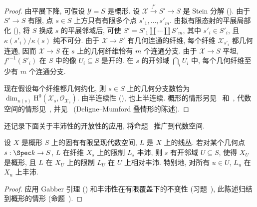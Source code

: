 \begin{proof}
由平展下降, 可假设 $\mathcal Y=S$ 是概形. 设 $\mathcal X\xrightarrow{f'}S'\to S$ 是 Stein 分解 (). 由于 $S'\to S$ 有限, 点 $s\in S$ 上方只有有限多个点 $s'_1,\ldots,s'_m$. 由拟有限态射的平展局部化 (), 将 $S$ 换成 $s$ 的平展邻域后, 可使 $S'=S'_1\amalg\cdots\amalg S'_m$, 其中 $s'_i\in S'_i$, 且 $\kappa(s'_i)/\kappa(s)$ 纯不可分. 由于 $\mathcal X\to S'$ 有几何连通的纤维, 每个纤维 $\mathcal X_{s'_i}$ 都几何连通, 因而 $\mathcal X\to S$ 在 $s$ 上的几何纤维恰有 $m$ 个连通分支. 由于 $\mathcal X\to S$ 平坦, $f'^{-1}(S'_i)$ 在 $S$ 中的像 $U_i\subseteq S$ 是开的. 在 $s$ 的开邻域 $\bigcap_i U_i$ 中, 每个几何纤维至少有 $m$ 个连通分支.

现在假设每个纤维都几何约化, 则 $s\in S$ 上的几何分支数恰为 $\dim_{\kappa(s)}\mathrm H^0(\mathcal X_s,\mathcal O_{\mathcal X_s})$. 由半连续性 (),  也上半连续. 概形的情形另见~\cite[IV$_3$.15.5.3--7]{EGA} 和~\cite[Tags 0BUI 和 0E0N]{SP}, 代数空间的情形见~\cite[Tags 0E1D 和 0E1E]{SP}, 并见~\cite[定理 $4.17$]{DM69} (Deligne--Mumford 叠情形的陈述).
\end{proof}
还记录下面关于丰沛性的开放性的应用, 将命题~ 推广到代数空间.
\begin{proposition}[丰沛性的开放性]\label{src:5.6.17}
设 $X$ 是概形 $S$ 上的固有有限呈现代数空间, $L$ 是 $X$ 上的线丛. 若对某个几何点 $s:\Spec k\to S$, $L$ 在纤维 $X_s$ 上的限制 $L_s$ 丰沛, 则 $s$ 有开邻域 $U\subseteq S$, 使得 $X_U$ 是概形, 且 $L$ 在 $X_U$ 上的限制 $L_U$ 在 $U$ 上相对丰沛. 特别地, 对所有 $u\in U$, $L_u$ 在 $X_u$ 上丰沛.
\end{proposition}
\begin{proof}
应用 Gabber 引理 () 和丰沛性在有限覆盖下的不变性 (习题~), 此陈述归结到概形的情形 (命题~).
\end{proof}
